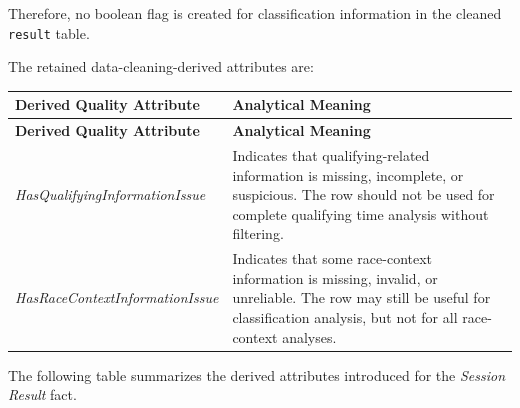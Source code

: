 \documentclass[a4paper,11pt]{article}
\begin{document}
	Therefore, no boolean flag is created for classification information in the cleaned
	\texttt{result} table.
	
	The retained data-cleaning-derived attributes are:
	
	\begin{longtable}{|p{5.5cm}|p{10.3cm}|}
		\hline
		\textbf{Derived Quality Attribute} & \textbf{Analytical Meaning} \\
		\hline
		\endfirsthead
		
		\hline
		\textbf{Derived Quality Attribute} & \textbf{Analytical Meaning} \\
		\hline
		\endhead
		
		\textit{HasQualifyingInformationIssue}
		&
		Indicates that qualifying-related information is missing, incomplete, or suspicious.
		The row should not be used for complete qualifying time analysis without filtering.
		\\
		\hline
		
		\textit{HasRaceContextInformationIssue}
		&
		Indicates that some race-context information is missing, invalid, or unreliable.
		The row may still be useful for classification analysis, but not for all race-context
		analyses.
		\\
		\hline
		
	\end{longtable}
	
	
	The following table summarizes the derived attributes introduced for the
	\textit{Session Result} fact.
	
\end{document}
